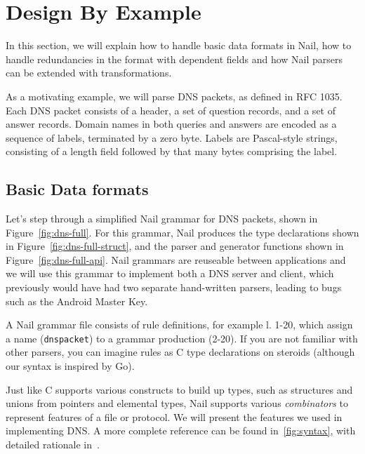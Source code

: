 \section{Design By Example}
In this section, we will explain how to handle basic data formats in Nail, how to handle
redundancies in the format with dependent fields and how Nail parsers can be extended with
transformations. 

As a motivating example, we will parse DNS packets, as defined in RFC 1035. Each DNS packet consists of a
header, a set of question records, and a set of answer records. Domain
names in both queries and answers are encoded as a sequence of labels,
terminated by a zero byte.  Labels are Pascal-style strings, consisting
of a length field followed by that many bytes comprising the label.
\label{s:design}
\subsection{Basic Data formats}


Let's step through a simplified Nail grammar for DNS
packets, shown in  Figure~\ref{fig:dns-full}.  For this grammar, Nail produces the type declarations
shown in Figure~\ref{fig:dns-full-struct}, and the parser and
generator functions shown in Figure~\ref{fig:dns-full-api}.
Nail grammars are reuseable between applications and we will use this grammar to implement
both a DNS server and client, which previously would have had two separate hand-written parsers,
leading to bugs such as  the Android Master Key. 

A Nail grammar file consists of rule definitions, for example l. 1-20,  which assign a name
(\texttt{dnspacket}) to a grammar production (2-20). If you are not familiar with
other parsers, you can imagine rules as C type declarations on steroids
(although our syntax is inspired by Go).

Just like C supports various constructs to build up types, such as structures and unions from pointers and
elemental types, Nail supports various \emph{combinators} to represent features of a file or protocol. We will present the features we used in implementing
DNS. A more complete reference can be found in~\ref{fig:syntax}, with detailed rationale in~\cite{bangert:nail-osdi14}.



